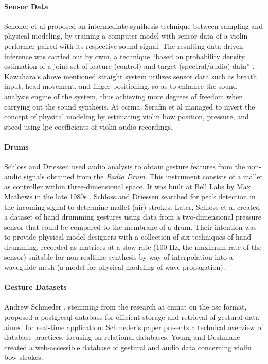 \paragraph{Sensor Data}
Schoner et al \parencite{DBLP:conf/icmc/SchonerCDG98} proposed an intermediate synthesis technique between sampling and physical modeling, by training a computer model with sensor data of a violin performer paired with its respective sound signal. The resulting data-driven inference was carried out by \gls{cwm}, a technique ``based on probability density estimation of a joint set of feature (control) and target (spectral/audio) data'' \parencite{DBLP:conf/icmc/SchonerCDG98}. Kawahara's above mentioned \gls{straight} system \parencite{icmc/bbp2372.1999.411} utilizes sensor data such as breath input, head movement, and finger positioning, so as to enhance the sound analysis engine of the system, thus achieving more degrees of freedom when carrying out the sound synthesis. At \gls{ccrma}, Serafin et al \parencite{icmc/bbp2372.2001.071} managed to invert the concept of physical modeling by estimating violin bow position, pressure, and speed using \gls{lpc} coefficients of violin audio recordings. 

\paragraph{Drums}
Schloss and Driessen \parencite{icmc/bbp2372.2001.103} used audio analysis to obtain gesture features from the non-audio signals obtained from the \textit{Radio Drum}. This instrument consists of a mallet as controller within three-dimensional space. It was built at Bell Labs by Max Mathews in the late 1980s \parencite{icmc/bbp2372.2001.103}. Schloss and Driessen searched for peak detection in the incoming signal to determine mallet (air) strokes. Later, Schloss et al \parencite{DBLP:conf/icmc/JonesLS07} created a dataset of hand drumming gestures using data from a two-dimensional pressure sensor that could be compared to the membrane of a drum. Their intention was to provide physical model designers with a collection of six techniques of hand drumming, recorded as matrices at a slow rate (100 Hz, the maximum rate of the sensor) suitable for non-realtime synthesis by way of interpolation into a waveguide mesh (a model for physical modeling of wave propagation).

\paragraph{Gesture Datasets}
Andrew Schmeder \parencite{icmc/bbp2372.2009.005}, stemming from the research at \gls{cnmat} on the \gls{osc} format, proposed a \gls{postgresql} database for efficient storage and retrieval of gestural data aimed for real-time application. Schmeder's paper presents a technical overview of database practices, focusing on relational databases. Young and Deshmane \parencite{Young2007} created a web-accessible database of gestural and audio data concerning violin bow strokes. 

